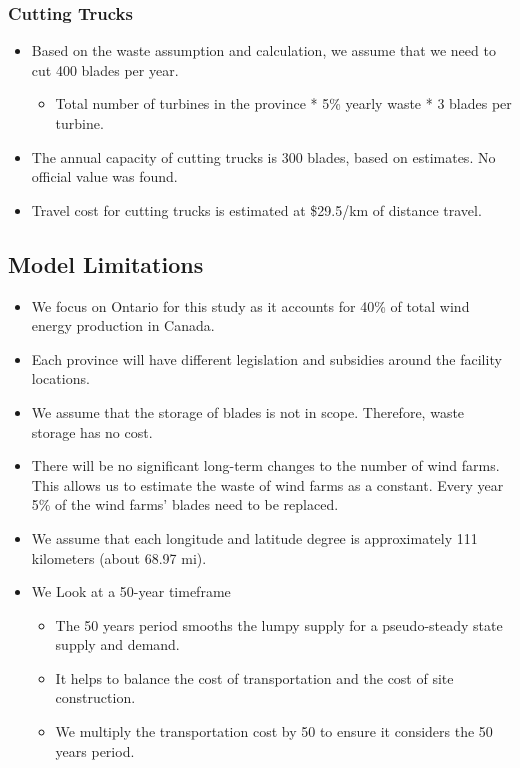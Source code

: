 \subsubsection{Cutting Trucks}
\begin{itemize}[noitemsep]
  \item Based on the waste assumption and calculation, we assume that we need to cut 400 blades per year. 
  \begin{itemize}[noitemsep]
      \item
      Total number of turbines in the province * 5\% yearly waste * 3 blades per turbine. 
  \end{itemize} 
  \item The annual capacity of cutting trucks is 300 blades, based on estimates. No official value was found.
  \item Travel cost for cutting trucks is estimated at \$29.5/km of distance travel. 
\end{itemize}

\subsection{Model Limitations}
\begin{itemize}[noitemsep]
  \item We focus on Ontario for this study as it accounts for 40\% of total wind energy production in Canada. 
  \item Each province will have different legislation and subsidies around the facility locations. 
  \item We assume that the storage of blades is not in scope. Therefore, waste storage has no cost. 
  \item There will be no significant long-term changes to the number of wind farms. This allows us to estimate the waste of wind farms as a constant. Every year 5\% of the wind farms’ blades need to be replaced. 
  \item We assume that each longitude and latitude degree is approximately 111 kilometers (about 68.97 mi).  
  \item We Look at a 50-year timeframe 
  \begin{itemize}[noitemsep]
    \item The 50 years period smooths the lumpy supply for a pseudo-steady state supply and demand. 
    \item It helps to balance the cost of transportation and the cost of site construction. 
    \item We multiply the transportation cost by 50 to ensure it considers the 50 years period.
  \end{itemize}
\end{itemize}



